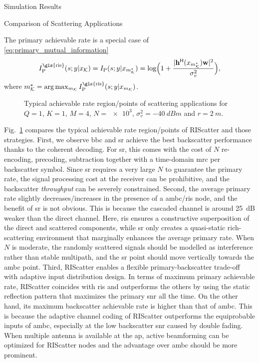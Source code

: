 \begin{section}{Simulation Results}
\begin{subsection}{Comparison of Scattering Applications}
\begin{itemize}
			The primary achievable rate is a special case of \eqref{eq:primary_mutual_information}
			\begin{equation}
				I_{\text{P}}^{\text{\gls{ris}}}(s;y|x_{\mathcal{K}}) = I_{\text{P}}(s;y|x_{m_{\mathcal{K}}^{\star}}) = \log \Bigl(1 + \frac{\lvert \mathbf{h}^\mathsf{H}(x_{m_{\mathcal{K}}^{\star}}) \mathbf{w} \rvert^2}{\sigma_v^2}\Bigr),
			\end{equation}
			where $m_{\mathcal{K}}^{\star} = \arg \max_{m_{\mathcal{K}}} I_{\text{P}}^{\text{\gls{ris}}}(s;y|x_{m_{\mathcal{K}}})$.
		\end{itemize}
		\begin{figure}[H]
			\centering
			\resizebox{0.65\columnwidth}{!}{
				
			}
			\caption{Typical achievable rate region/points of scattering applications for $Q=1$, $K=1$, $M=4$, $N=\num{e3}$, $\sigma_v^2=\qty{-40}{dBm}$ and $r=\qty{2}{m}$.}
			\label{fg:region_comparison}
		\end{figure}

		Fig.~\ref{fg:region_comparison} compares the typical achievable rate region/points of RIScatter and those strategies.
		First, we observe \gls{bbc} and \gls{sr} achieve the best backscatter performance thanks to the coherent decoding.
		For \gls{sr}, this comes with the cost of $N$ re-encoding, precoding, subtraction together with a time-domain \gls{mrc} per backscatter symbol.
		Since \gls{sr} requires a very large $N$ to guarantee the primary rate, the signal processing cost at the receiver can be prohibitive, and the backscatter \emph{throughput} can be severely constrained.
		Second, the average primary rate slightly decreases/increases in the presence of a \gls{ambc}/\gls{ris} node, and the benefit of \gls{sr} is not obvious.
		This is because the cascaded channel is around \qty{25}{dB} weaker than the direct channel.
		Here, \gls{ris} ensures a constructive superposition of the direct and scattered components, while \gls{sr} only creates a quasi-static rich-scattering environment that marginally enhances the average primary rate.
		When $N$ is moderate, the randomly scattered signals should be modelled as interference rather than stable multipath, and the \gls{sr} point should move vertically towards the \gls{ambc} point.
		Third, RIScatter enables a flexible primary-backscatter trade-off with adaptive input distribution design.
		In terms of maximum primary achievable rate, RIScatter coincides with \gls{ris} and outperforms the others by using the static reflection pattern that maximizes the primary \gls{snr} all the time.
		On the other hand, its maximum backscatter achievable rate is higher than that of \gls{ambc}.
		This is because the adaptive channel coding of RIScatter outperforms the equiprobable inputs of \gls{ambc}, especially at the low backscatter \gls{snr} caused by double fading.
		When multiple antenna is available at the \gls{ap}, active beamforming can be optimized for RIScatter nodes and the advantage over \gls{ambc} should be more prominent.
	\end{subsection}


\end{section}
